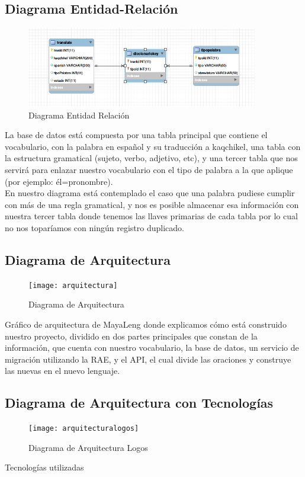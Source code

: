 \documentclass[a4paper,openright,11pt]{article}
\begin{document}
\subsection{Diagrama Entidad-Relación}
\begin{figure}[h]
	\centering
	\includegraphics[width=0.9\textwidth]{er}
	\caption{Diagrama Entidad Relación}
	\label{fig:er}
\end{figure}
La base de datos está compuesta por una tabla principal que contiene el vocabulario, con la palabra en español y su traducción a kaqchikel, una tabla con la estructura gramatical (sujeto, verbo, adjetivo, etc), y una tercer tabla que nos servirá para enlazar nuestro vocabulario con el tipo de palabra a la que aplique (por ejemplo: él=pronombre).\\
En nuestro diagrama está contemplado el caso que una palabra pudiese cumplir con más de una regla gramatical, y nos es posible almacenar esa información con nuestra tercer tabla donde tenemos las llaves primarias de cada tabla por lo cual no nos toparíamos con ningún registro duplicado.

\subsection{Diagrama de Arquitectura}
\begin{figure}[h]
	\centering
	\texttt{[image: arquitectura]}
	\caption{Diagrama de Arquitectura}
	\label{fig:arq}
\end{figure}
Gráfico de arquitectura de MayaLeng donde explicamos cómo está construido nuestro proyecto, dividido en dos partes principales que constan de la información, que cuenta con nuestro vocabulario, la base de datos, un servicio de migración utilizando la RAE, y el API, el cual divide las oraciones y construye las nuevas en el nuevo lenguaje.

\subsection{Diagrama de Arquitectura con Tecnologías}
\begin{figure}[h]
	\centering
	\texttt{[image: arquitecturalogos]}
	\caption{Diagrama de Arquitectura Logos} 
	\label{fig:arqL}
\end{figure}
Tecnologías utilizadas
\end{document}
